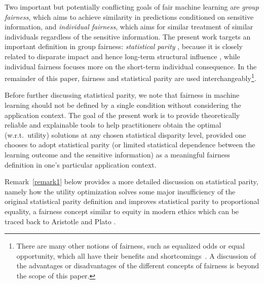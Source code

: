 \documentclass[twoside,11pt]{article}
\newcommand{\edit}[1]{\textcolor{blue}{#1}}
\begin{document}
Two important but potentially conflicting goals of fair machine learning are {\em group fairness}, which aims to achieve similarity in predictions conditioned on sensitive information, and {\em individual fairness}, which aims for similar treatment of similar individuals regardless of the sensitive information. The present work targets an important definition in group fairness: {\em statistical parity} \cite{dwork2012fairness}, because it is closely related to disparate impact and hence long-term structural influence \cite{zhou2021bias}, while individual fairness focuses more on the short-term individual consequence. %
In the remainder of this paper, fairness and statistical parity are used interchangeably\footnote{There are many other notions of fairness, such as equalized odds or equal opportunity, which all have their benefits and shortcomings~\cite{chouldechova2018frontiers}. A discussion of the advantages or disadvantages of the different concepts of fairness is beyond the scope of this paper.}.%

Before further discussing statistical parity, we note that fairness in machine learning should not be defined by a single condition without considering the application context. The goal of the present work is to provide theoretically reliable and explainable tools to help practitioners obtain the optimal (w.r.t.\ utility) solutions at any chosen statistical disparity level, provided one chooses to adopt statistical parity (or limited statistical dependence between the learning outcome and the sensitive information) as a meaningful fairness definition in one's particular application context.

Remark~\ref{remark1} below provides a more detailed discussion on statistical parity, namely how the utility optimization solves some major insufficiency of the original statistical parity definition and improves statistical parity to proportional equality, a fairness concept similar to equity in modern ethics which can be traced back to Aristotle and Plato \cite{aristotle1984complete, cooper1997plato}.
\end{document}
